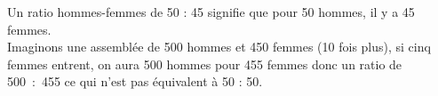    Un ratio hommes-femmes de 50 : 45 signifie que pour 50 hommes, il y a 45 femmes. \\
   Imaginons une assemblée de 500 hommes et 450 femmes (10 fois plus), si cinq femmes entrent, on aura 500 hommes pour 455 femmes donc un ratio de 500~:~455 ce qui n'est {\blue pas équivalent à 50 : 50.}
